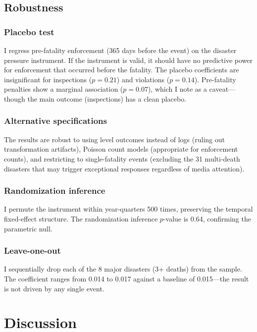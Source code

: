\documentclass[12pt]{article}
\begin{document}
\subsection{Robustness}



\subsubsection*{Placebo test} I regress pre-fatality enforcement (365 days before the event) on the disaster pressure instrument. If the instrument is valid, it should have no predictive power for enforcement that occurred before the fatality. The placebo coefficients are insignificant for inspections ($p = 0.21$) and violations ($p = 0.14$). Pre-fatality penalties show a marginal association ($p = 0.07$), which I note as a caveat---though the main outcome (inspections) has a clean placebo.

\subsubsection*{Alternative specifications} The results are robust to using level outcomes instead of logs (ruling out transformation artifacts), Poisson count models (appropriate for enforcement counts), and restricting to single-fatality events (excluding the 31 multi-death disasters that may trigger exceptional responses regardless of media attention).

\subsubsection*{Randomization inference} I permute the instrument within year-quarters 500 times, preserving the temporal fixed-effect structure. The randomization inference $p$-value is 0.64, confirming the parametric null.

\subsubsection*{Leave-one-out} I sequentially drop each of the 8 major disasters (3+ deaths) from the sample. The coefficient ranges from 0.014 to 0.017 against a baseline of 0.015---the result is not driven by any single event.


\section{Discussion}
\end{document}
